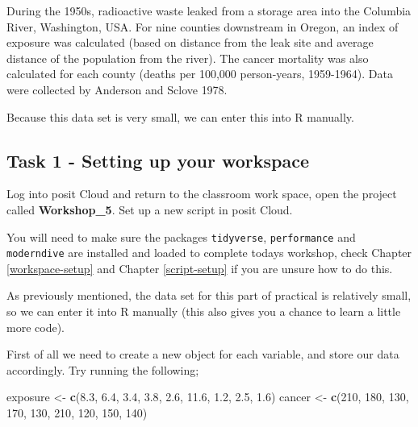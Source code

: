 \documentclass[
]{book}
\newenvironment{Shaded}{\begin{snugshade}}{\end{snugshade}}
\newcommand{\DecValTok}[1]{\textcolor[rgb]{0.00,0.00,0.81}{#1}}
\newcommand{\FloatTok}[1]{\textcolor[rgb]{0.00,0.00,0.81}{#1}}
\newcommand{\FunctionTok}[1]{\textcolor[rgb]{0.13,0.29,0.53}{\textbf{#1}}}
\newcommand{\NormalTok}[1]{#1}
\newcommand{\OtherTok}[1]{\textcolor[rgb]{0.56,0.35,0.01}{#1}}
\begin{document}
During the 1950s, radioactive waste leaked from a storage area into the Columbia River, Washington, USA. For nine counties downstream in Oregon, an index of exposure was calculated (based on distance from the leak site and average distance of the population from the river). The cancer mortality was also calculated for each county (deaths per 100,000 person-years, 1959-1964). Data were collected by Anderson and Sclove 1978.

Because this data set is very small, we can enter this into R manually.

\subsection{Task 1 - Setting up your workspace}\label{manual-data-entry}

Log into posit Cloud and return to the classroom work space, open the project called \textbf{Workshop\_5}. Set up a new script in posit Cloud.

You will need to make sure the packages \texttt{tidyverse}, \texttt{performance} and \texttt{moderndive} are installed and loaded to complete todays workshop, check Chapter \ref{workspace-setup} and Chapter \ref{script-setup} if you are unsure how to do this.

As previously mentioned, the data set for this part of practical is relatively small, so we can enter it into R manually (this also gives you a chance to learn a little more code).

First of all we need to create a new object for each variable, and store our data accordingly. Try running the following;

\begin{Shaded}
\begin{Highlighting}[]
\NormalTok{exposure }\OtherTok{\textless{}{-}} \FunctionTok{c}\NormalTok{(}\FloatTok{8.3}\NormalTok{, }\FloatTok{6.4}\NormalTok{, }\FloatTok{3.4}\NormalTok{, }\FloatTok{3.8}\NormalTok{, }\FloatTok{2.6}\NormalTok{, }\FloatTok{11.6}\NormalTok{, }\FloatTok{1.2}\NormalTok{, }\FloatTok{2.5}\NormalTok{, }\FloatTok{1.6}\NormalTok{)}
\NormalTok{cancer }\OtherTok{\textless{}{-}} \FunctionTok{c}\NormalTok{(}\DecValTok{210}\NormalTok{, }\DecValTok{180}\NormalTok{, }\DecValTok{130}\NormalTok{, }\DecValTok{170}\NormalTok{, }\DecValTok{130}\NormalTok{, }\DecValTok{210}\NormalTok{, }\DecValTok{120}\NormalTok{, }\DecValTok{150}\NormalTok{, }\DecValTok{140}\NormalTok{)}
\end{Highlighting}
\end{Shaded}
\end{document}
